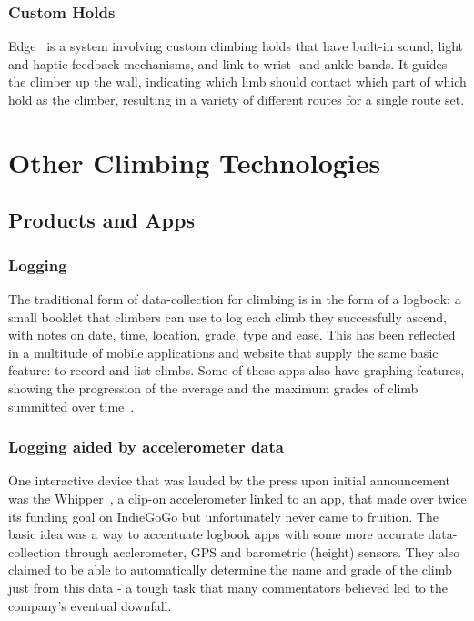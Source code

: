 \subsubsection{Custom Holds}
Edge~\cite{edgeinteractive} is a system involving custom climbing holds that have built-in sound, light and haptic feedback mechanisms, and link to wrist- and ankle-bands.
It guides the climber up the wall, indicating which limb should contact which part of which hold as the climber, resulting in a variety of different routes for a single route set.




\section{Other Climbing Technologies}
\subsection{Products and Apps}
\subsubsection{Logging}
The traditional form of data-collection for climbing is in the form of a logbook: a small booklet that climbers can use to log each climb they successfully ascend, with notes on date, time, location, grade, type and ease.
This has been reflected in a multitude of mobile applications and website that supply the same basic feature: to record and list climbs.
Some of these apps also have graphing features, showing the progression of the average and the maximum grades of climb summitted over time~\cite{verticallife}.

\subsubsection{Logging aided by accelerometer data}
One interactive device that was lauded by the press upon initial announcement was the Whipper~\cite{whipper}, a clip-on accelerometer linked to an app, that made over twice its funding goal on IndieGoGo but unfortunately never came to fruition.
The basic idea was a way to accentuate logbook apps with some more accurate data-collection through acclerometer, GPS and barometric (height) sensors.
They also claimed to be able to automatically determine the name and grade of the climb just from this data - a tough task that many commentators believed led to the company's eventual downfall.

